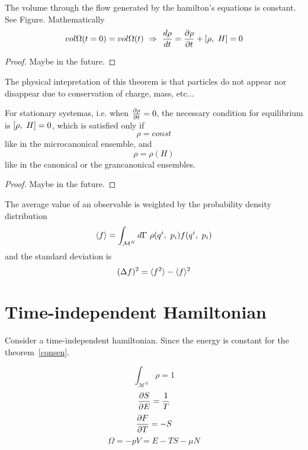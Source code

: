     \begin{theorem}[Liouville]
        The volume through the flow generated by the hamilton's equations is constant. See Figure. Mathematically
        \begin{equation*}
            vol \Omega(t=0) = vol \Omega(t) ~\Rightarrow~ \frac{d\rho}{dt} = \frac{\partial\rho}{\partial t} + [\rho,~H] = 0
        \end{equation*}
    \end{theorem}

    \begin{proof}
        Maybe in the future.
    \end{proof}

    The physical intepretation of this theorem is that particles do not appear nor disappear due to conservation of charge, mass, etc...

    For stationary systemas, i.e. when $\frac{\partial\rho}{\partial t} = 0$, the necessary condition for equilibrium is $[\rho,~H] = 0$, which is satisfied only if 
    \begin{equation*}
        \rho = const 
    \end{equation*}
    like in the microcanonical ensemble, and 
    \begin{equation*}
        \rho = \rho(H)
    \end{equation*}
    like in the canonical or the grancanonical ensembles.

    \begin{proof}
        Maybe in the future.
    \end{proof}

    The average value of an observable is weighted by the probability density distribution
    \begin{equation}\label{clav}
        \langle f\rangle = \int_{\mathcal M^N} d\Gamma ~ \rho(q^i, ~p_i) f(q^i, ~p_i)
    \end{equation}
    and the standard deviation is 
    \begin{equation*}
        (\Delta f)^2 = \langle f^2\rangle - \langle f\rangle^2
    \end{equation*}

\section{Time-independent Hamiltonian}

    Consider a time-independent hamiltonian. Since the energy is constant for the theorem~\ref{consen}.

    \begin{equation}\label{norm}
        \int_{\mathcal M^N} \rho = 1
    \end{equation}
    \begin{equation}\label{T}
        \frac{\partial S}{\partial E} = \frac{1}{T}
    \end{equation}
    \begin{equation}\label{F}
        \frac{\partial F}{\partial T} = - S
    \end{equation}
    \begin{equation}\label{OM}
        \Omega = - pV = E - TS - \mu N
    \end{equation}

